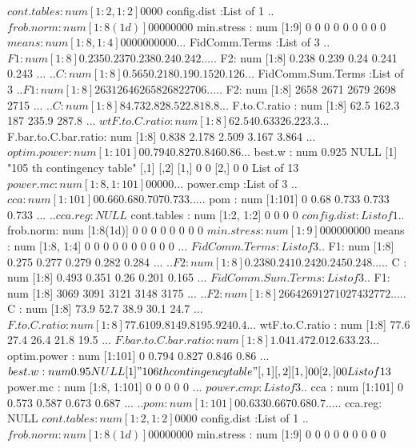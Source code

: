 \documentclass[11pt]{article} %
\begin{document}
\begin{Schunk}
\begin{Soutput}
 $ cont.tables         : num [1:2, 1:2] 0 0 0 0
 $ config.dist         :List of 1
  ..$ frob.norm: num [1:8(1d)] 0 0 0 0 0 0 0 0
 $ min.stress          : num [1:9] 0 0 0 0 0 0 0 0 0
 $ means               : num [1:8, 1:4] 0 0 0 0 0 0 0 0 0 0 ...
 $ FidComm.Terms       :List of 3
  ..$ F1: num [1:8] 0.235 0.237 0.238 0.24 0.242 ...
  ..$ F2: num [1:8] 0.238 0.239 0.24 0.241 0.243 ...
  ..$ C : num [1:8] 0.565 0.218 0.19 0.152 0.126 ...
 $ FidComm.Sum.Terms   :List of 3
  ..$ F1: num [1:8] 2631 2646 2658 2682 2706 ...
  ..$ F2: num [1:8] 2658 2671 2679 2698 2715 ...
  ..$ C : num [1:8] 84.7 32.8 28.5 22.8 18.8 ...
 $ F.to.C.ratio        : num [1:8] 62.5 162.3 187 235.9 287.8 ...
 $ wtF.to.C.ratio      : num [1:8] 62.5 40.6 33 26.2 23.3 ...
 $ F.bar.to.C.bar.ratio: num [1:8] 0.838 2.178 2.509 3.167 3.864 ...
 $ optim.power         : num [1:101] 0 0.794 0.827 0.846 0.86 ...
 $ best.w              : num 0.925
NULL
[1] "105 th contingency table"
     [,1] [,2]
[1,]    0    0
[2,]    0    0
List of 13
 $ power.mc            : num [1:8, 1:101] 0 0 0 0 0 ...
 $ power.cmp           :List of 3
  ..$ cca    : num [1:101] 0 0.66 0.68 0.707 0.733 ...
  ..$ pom    : num [1:101] 0 0.68 0.733 0.733 0.733 ...
  ..$ cca.reg: NULL
 $ cont.tables         : num [1:2, 1:2] 0 0 0 0
 $ config.dist         :List of 1
  ..$ frob.norm: num [1:8(1d)] 0 0 0 0 0 0 0 0
 $ min.stress          : num [1:9] 0 0 0 0 0 0 0 0 0
 $ means               : num [1:8, 1:4] 0 0 0 0 0 0 0 0 0 0 ...
 $ FidComm.Terms       :List of 3
  ..$ F1: num [1:8] 0.275 0.277 0.279 0.282 0.284 ...
  ..$ F2: num [1:8] 0.238 0.241 0.242 0.245 0.248 ...
  ..$ C : num [1:8] 0.493 0.351 0.26 0.201 0.165 ...
 $ FidComm.Sum.Terms   :List of 3
  ..$ F1: num [1:8] 3069 3091 3121 3148 3175 ...
  ..$ F2: num [1:8] 2664 2691 2710 2743 2772 ...
  ..$ C : num [1:8] 73.9 52.7 38.9 30.1 24.7 ...
 $ F.to.C.ratio        : num [1:8] 77.6 109.8 149.8 195.9 240.4 ...
 $ wtF.to.C.ratio      : num [1:8] 77.6 27.4 26.4 21.8 19.5 ...
 $ F.bar.to.C.bar.ratio: num [1:8] 1.04 1.47 2.01 2.63 3.23 ...
 $ optim.power         : num [1:101] 0 0.794 0.827 0.846 0.86 ...
 $ best.w              : num 0.95
NULL
[1] "106 th contingency table"
     [,1] [,2]
[1,]    0    0
[2,]    0    0
List of 13
 $ power.mc            : num [1:8, 1:101] 0 0 0 0 0 ...
 $ power.cmp           :List of 3
  ..$ cca    : num [1:101] 0 0.573 0.587 0.673 0.687 ...
  ..$ pom    : num [1:101] 0 0.633 0.667 0.68 0.7 ...
  ..$ cca.reg: NULL
 $ cont.tables         : num [1:2, 1:2] 0 0 0 0
 $ config.dist         :List of 1
  ..$ frob.norm: num [1:8(1d)] 0 0 0 0 0 0 0 0
 $ min.stress          : num [1:9] 0 0 0 0 0 0 0 0 0

\end{Soutput}
\end{Schunk}
\end{document}
